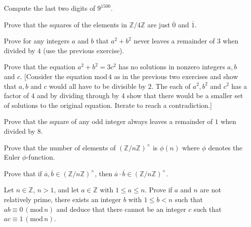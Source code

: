 \documentclass[12pt]{article}
\newenvironment{problem}[2][Exercise]{\begin{trivlist}
\item[\hskip \labelsep {\bfseries #1}\hskip \labelsep {\bfseries #2.}]}{\end{trivlist}}
\begin{document}
\begin{problem}{0.3.5}
Compute the last two digits of $9^{1500}$.
\end{problem}




\begin{problem}{0.3.6}
Prove that the squares of the elements in $\mathbb{Z}/4\mathbb{Z}$ are just $\overline{0}$ and $\overline{1}$.
\end{problem}




\begin{problem}{0.3.7}
Prove for any integers $a$ and $b$ that $a^2+b^2$ never leaves a remainder of $3$ when divided by $4$ (use the previous exercise).
\end{problem}




\begin{problem}{0.3.8}
Prove that the equation $a^2+b^2 = 3c^2$ has no solutions in nonzero integers $a,b$ and $c$. [Consider the equation $\text{mod}\, 4$ as in the previous two exercises and show that $a,b$ and $c$ would all have to be divisible by $2$. The each of $a^2,b^2$ and $c^2$ has a factor of $4$ and by dividing through by $4$ show that there would be a smaller set of solutions to the original equation. Iterate to reach a contradiction.]
\end{problem}




\begin{problem}{0.3.9}
Prove that the square of any odd integer always leaves a remainder of $1$ when divided by $8$.
\end{problem}




\begin{problem}{0.3.10}
Prove that the number of elements of $\left(\mathbb{Z}/n\mathbb{Z}\right)^{\times}$ is $\phi\left(n\right)$ where $\phi$ denotes the Euler $\phi$-function.
\end{problem}




\begin{problem}{0.3.11}
Prove that if $\overline{a},\overline{b} \in \left(\mathbb{Z}/n\mathbb{Z}\right)^{\times}$, then $\overline{a}\cdot \overline{b} \in \left(\mathbb{Z}/n\mathbb{Z}\right)^{\times}$.
\end{problem}




\begin{problem}{0.3.12}
Let $n\in\mathbb{Z}$, $n>1$, and let $a\in \mathbb{Z}$ with $1\leq a \leq n$. Prove if $a$ and $n$ are not relatively prime, there exists an integer $b$ with $1\leq b < n$ such that $ab\equiv 0 \, \left(\text{mod} \, n\right)$ and deduce that there cannot be an integer $c$ such that $ac \equiv 1 \, \left(\text{mod} \, n\right)$.
\end{problem}
\end{document}
